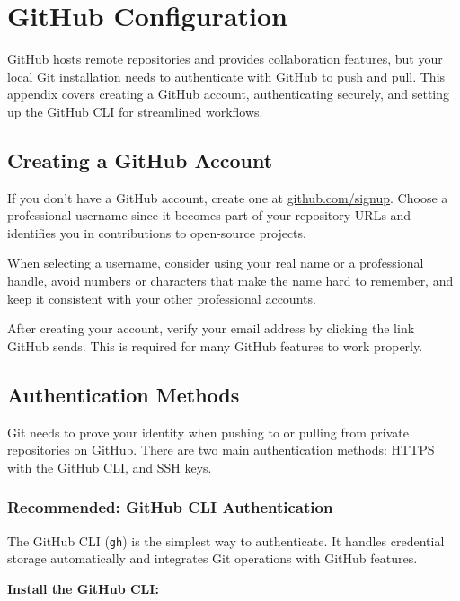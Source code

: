 \documentclass[
  letterpaper,
  DIV=11,
  numbers=noendperiod]{scrreprt}
\begin{document}
\chapter{GitHub Configuration}\label{sec-github-config}

GitHub hosts remote repositories and provides collaboration features,
but your local Git installation needs to authenticate with GitHub to
push and pull. This appendix covers creating a GitHub account,
authenticating securely, and setting up the GitHub CLI for streamlined
workflows.

\section{Creating a GitHub Account}\label{creating-a-github-account}

If you don't have a GitHub account, create one at
\href{https://github.com/signup}{github.com/signup}. Choose a
professional username since it becomes part of your repository URLs and
identifies you in contributions to open-source projects.

When selecting a username, consider using your real name or a
professional handle, avoid numbers or characters that make the name hard
to remember, and keep it consistent with your other professional
accounts.

After creating your account, verify your email address by clicking the
link GitHub sends. This is required for many GitHub features to work
properly.

\section{Authentication Methods}\label{authentication-methods}

Git needs to prove your identity when pushing to or pulling from private
repositories on GitHub. There are two main authentication methods: HTTPS
with the GitHub CLI, and SSH keys.

\subsection{Recommended: GitHub CLI
Authentication}\label{recommended-github-cli-authentication}

The GitHub CLI (\texttt{gh}) is the simplest way to authenticate. It
handles credential storage automatically and integrates Git operations
with GitHub features.

\textbf{Install the GitHub CLI:}
\end{document}
